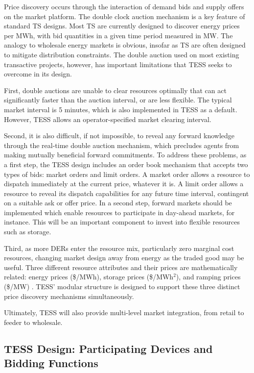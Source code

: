 Price discovery occurs through the interaction of demand bids and supply offers on the market platform. 
The double clock auction mechanism is a key feature of standard TS designs. Most TS are currently designed to discover energy prices per MWh, with bid quantities in a given time period measured in MW.  The analogy to wholesale energy markets is obvious, insofar as TS are often designed to mitigate distribution constraints.
The double auction used on most existing transactive projects, however, has important limitations that TESS seeks to overcome in its design. 

First, double auctions are unable to clear resources optimally that can act significantly faster than the auction interval, or are less flexible. The typical market interval is 5 minutes, which is also implemented in TESS as a default. However, TESS allows an operator-specified market clearing interval.

Second, it is also difficult, if not impossible, to reveal any forward knowledge through the real-time double auction  mechanism, which precludes agents from making mutually beneficial forward commitments. To address these problems, as a first step, the TESS design includes an order book mechanism that accepts two types of bids: market orders and limit orders. A market order allows a resource to dispatch immediately at the current price, whatever it is. A limit order allows a resource to reveal its dispatch capabilities for any future time interval, contingent on a suitable ask or offer price. 
In a second step, forward markets should be implemented which enable resources to participate in day-ahead markets, for instance. This will be an important component to invest into flexible resources such as storage.

Third, as more DERs enter the resource mix, particularly zero marginal cost resources, changing market design away from energy as the traded good may be useful. Three different resource attributes and their prices are mathematically related: energy prices (\$/MWh), storage prices (\$/MWh$^2$), and ramping prices (\$/MW) \citep{chassin2017thesis}. TESS' modular structure is designed to support these three distinct price discovery mechanisms simultaneously. 

Ultimately, TESS will also provide multi-level market integration, from retail to feeder to wholesale.

\subsection{TESS Design: Participating Devices and Bidding Functions}\label{sec:devices}

